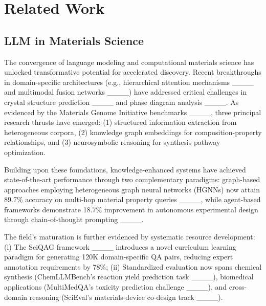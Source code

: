 \section{Related Work}
\subsection{LLM in Materials Science}
The convergence of language modeling and computational materials science has unlocked transformative potential for accelerated discovery. Recent breakthroughs in domain-specific architectures (e.g., hierarchical attention mechanisms ____ and multimodal fusion networks ____) have addressed critical challenges in crystal structure prediction ____ and phase diagram analysis ____. As evidenced by the Materials Genome Initiative benchmarks ____, three principal research thrusts have emerged: (1) structured information extraction from heterogeneous corpora, (2) knowledge graph embeddings for composition-property relationships, and (3) neurosymbolic reasoning for synthesis pathway optimization.

Building upon these foundations, knowledge-enhanced systems have achieved state-of-the-art performance through two complementary paradigms: graph-based approaches employing heterogeneous graph neural networks (HGNNs) now attain 89.7\% accuracy on multi-hop material property queries ____, while agent-based frameworks demonstrate 18.7\% improvement in autonomous experimental design through chain-of-thought prompting ____.

The field's maturation is further evidenced by systematic resource development: (i) The SciQAG framework ____ introduces a novel curriculum learning paradigm for generating 120K domain-specific QA pairs, reducing expert annotation requirements by 78\%; (ii) Standardized evaluation now spans chemical synthesis (ChemLLMBench's reaction yield prediction task ____), biomedical applications (MultiMedQA's toxicity prediction challenge ____), and cross-domain reasoning (SciEval's materials-device co-design track ____).



